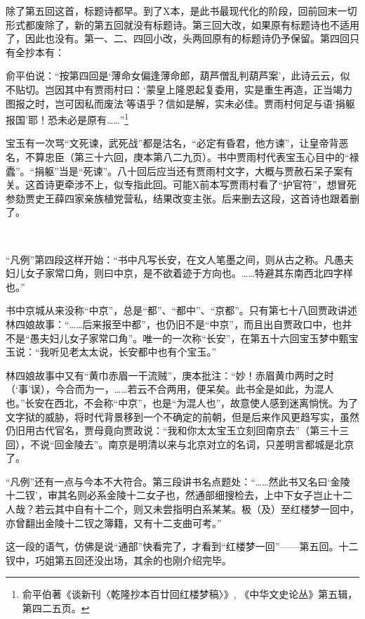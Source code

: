 \par 除了第五回这首，标题诗都早。到了X本，是此书最现代化的阶段，回前回末一切形式都废除了，新的第五回就没有标题诗。第三回大改，如果原有标题诗也不适用了，因此也没有。第一、二、四回小改，头两回原有的标题诗仍予保留。第四回只有全抄本有：
\par 俞平伯说：“按第四回是‘薄命女偏逢薄命郎，葫芦僧乱判葫芦案’，此诗云云，似不贴切。岂因其中有贾雨村曰：‘蒙皇上隆恩起复委用，实是重生再造，正当竭力图报之时，岂可因私而废法’等语乎？信如是解，实未必佳。贾雨村何足与语‘捐躯报国’耶！恐未必是原有……”\footnote{俞平伯著《谈新刊〈乾隆抄本百廿回红楼梦稿〉》, 《中华文史论丛》第五辑，第四二五页。}
\par 宝玉有一次骂“文死谏，武死战”都是沽名，“必定有昏君，他方谏”，让皇帝背恶名，不算忠臣（第三十六回，庚本第八二九页）。书中贾雨村代表宝玉心目中的“禄蠹”。“捐躯”当是“死谏”。八十回后应当还有贾雨村文字，大概与贾赦石呆子案有关。这首诗更牵涉不上，似专指此回。可能X前本写贾雨村看了“护官符”，想冒死参劾贾史王薛四家亲族植党营私，结果改变主张。后来删去这段，这首诗也跟着删了。
\par  
\par “凡例”第四段这样开始：“书中凡写长安，在文人笔墨之间，则从古之称。凡愚夫妇儿女子家常口角，则曰中京，是不欲着迹于方向也。……特避其东南西北四字样也。”
\par 书中京城从来没称“中京”，总是“都”、“都中”、“京都”。只有第七十八回贾政讲述林四娘故事：“……后来报至中都”，也仍旧不是“中京”，而且出自贾政口中，也并不是“愚夫妇儿女子家常口角”。唯一的一次称“长安”，在第五十六回宝玉梦中甄宝玉说：“我听见老太太说，长安都中也有个宝玉。”
\par 林四娘故事中又有“黄巾赤眉一干流贼”，庚本批注：“妙！赤眉黄巾两时之时（‘事’误），今合而为一，……若云不合两用，便呆矣。此书全是如此，为混人也。”长安在西北，不会称“中京”，也是“为混人也”，故意使人感到迷离惝恍。为了文字狱的威胁，将时代背景移到一个不确定的前朝，但是后来作风更趋写实，虽然仍旧用古代官名，贾母竟向贾政说：“我和你太太宝玉立刻回南京去”（第三十三回），不说“回金陵去”。南京是明清以来与北京对立的名词，只差明言都城是北京了。
\par “凡例”还有一点与今本不大符合。第三段讲书名点题处：“……然此书又名曰‘金陵十二钗’，审其名则必系金陵十二女子也，然通部细搜检去，上中下女子岂止十二人哉？若云其中自有十二个，则又未尝指明白系某某。极（及）至红楼梦一回中，亦曾翻出金陵十二钗之簿籍，又有十二支曲可考。”
\par 这一段的语气，仿佛是说“通部”快看完了，才看到“红楼梦一回”——第五回。十二钗中，巧姐第五回还没出场，其余的也刚介绍完毕。
